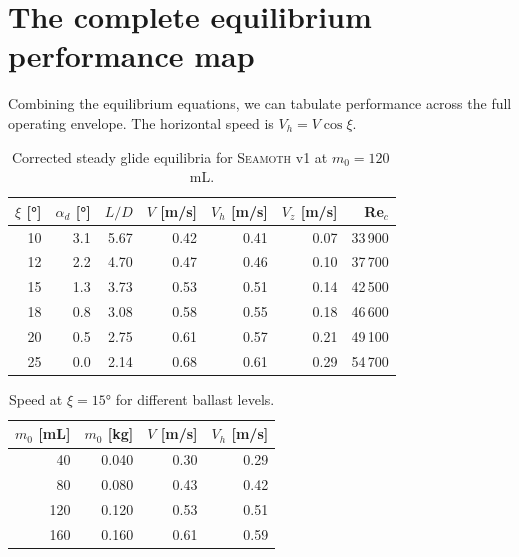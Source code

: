\documentclass[11pt,a4paper]{article}
\newcommand{\seamoth}{\textsc{Seamoth}}
\begin{document}
\section{The complete equilibrium performance map}
\label{sec:perfmap}

Combining the equilibrium equations, we can tabulate performance across the full
operating envelope.  The horizontal speed is $V_h = V\cos\xi$.

\begin{table}[H]
\centering
\caption{Corrected steady glide equilibria for \seamoth{} v1 at $m_0=120$\,mL.}
\label{tab:equil}
\begin{tabular}{@{}r r r r r r r@{}}
\toprule
$\xi$ [°] & $\alpha_d$ [°] & $L/D$ & $V$ [m/s] & $V_h$ [m/s] & $V_z$ [m/s] & Re$_c$ \\
\midrule
10 & 3.1 & 5.67 & 0.42 & 0.41 & 0.07 & 33\,900 \\
12 & 2.2 & 4.70 & 0.47 & 0.46 & 0.10 & 37\,700 \\
15 & 1.3 & 3.73 & 0.53 & 0.51 & 0.14 & 42\,500 \\
18 & 0.8 & 3.08 & 0.58 & 0.55 & 0.18 & 46\,600 \\
20 & 0.5 & 2.75 & 0.61 & 0.57 & 0.21 & 49\,100 \\
25 & 0.0 & 2.14 & 0.68 & 0.61 & 0.29 & 54\,700 \\
\bottomrule
\end{tabular}
\end{table}

\begin{table}[H]
\centering
\caption{Speed at $\xi=15°$ for different ballast levels.}
\label{tab:speedballast}
\begin{tabular}{@{}r r r r@{}}
\toprule
$m_0$ [mL] & $m_0$ [kg] & $V$ [m/s] & $V_h$ [m/s] \\
\midrule
40  & 0.040 & 0.30 & 0.29 \\
80  & 0.080 & 0.43 & 0.42 \\
120 & 0.120 & 0.53 & 0.51 \\
160 & 0.160 & 0.61 & 0.59 \\
\bottomrule
\end{tabular}
\end{table}
\end{document}
